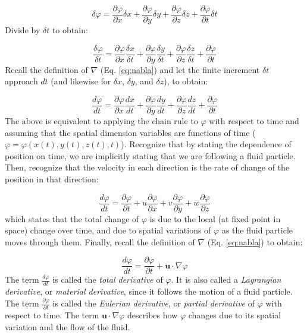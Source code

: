 \documentclass[12pt]{article}
\numberwithin{equation}{section}
\numberwithin{figure}{section}
\numberwithin{table}{section}
\begin{document}
\begin{equation}
  \delta\varphi = \frac{\partial \varphi}{\partial x} \delta x +
    \frac{\partial \varphi}{\partial y} \delta y +
    \frac{\partial \varphi}{\partial z} \delta z +
    \frac{\partial \varphi}{\partial t} \delta t
\end{equation}
Divide by $\delta t$ to obtain:

\begin{equation}
  \frac{\delta\varphi}{\delta t} = \frac{\partial \varphi}{\partial x} \frac{\delta x}{\delta t} +
    \frac{\partial \varphi}{\partial y} \frac{\delta y}{\delta t} +
    \frac{\partial \varphi}{\partial z} \frac{\delta z}{\delta t} +
    \frac{\partial \varphi}{\partial t}
\end{equation}
Recall the definition of $\nabla$ (Eq. \ref{eq:nabla}) and let the finite
increment $\delta t$ approach $dt$ (and likewise for $\delta x$, $\delta y$, and
$\delta z$), to obtain:

\begin{equation}
  \frac{d\varphi}{dt} = \frac{\partial \varphi}{\partial x} \frac{dx}{dt} +
    \frac{\partial \varphi}{\partial y} \frac{dy}{dt} +
    \frac{\partial \varphi}{\partial z} \frac{dz}{dt} +
    \frac{\partial \varphi}{\partial t}
\end{equation}
The above is equivalent to applying the chain rule to $\varphi$ with respect
to time and assuming that the spatial dimension variables are functions of time
($\varphi = \varphi(x(t), y(t), z(t), t)$).
Recognize that by stating the dependence of position on time, we are implicitly
stating that we are following a fluid particle.
Then, recognize that the velocity in each direction is the rate of change of
the position in that direction:

\begin{equation}
  \frac{d\varphi}{dt} =
    \frac{\partial \varphi}{\partial t} +
    u \frac{\partial \varphi}{\partial x} +
    v \frac{\partial \varphi}{\partial y} +
    w \frac{\partial \varphi}{\partial z}
\end{equation}
which states that the total change of $\varphi$ is due to the local (at fixed
point in space) change over time, and due to spatial variations of $\varphi$ as
the fluid particle moves through them.
Finally, recall the definition of $\nabla$ (Eq. \ref{eq:nabla}) to obtain:

\begin{equation}
  \label{eq:lagrangian_derivative}
  \frac{d\varphi}{dt} = \frac{\partial \varphi}{\partial t} + \mathbf{u} \cdot \nabla \varphi
\end{equation}
The term $\frac{d\varphi}{dt}$ is called the \textit{total derivative}
of $\varphi$. It is also called a \textit{Lagrangian derivative},
or \textit{material derivative}, since it follows
the motion of a fluid particle.
The term $\frac{\partial \varphi}{\partial t}$ is called the
\textit{Eulerian derivative},
or \textit{partial derivative}
of $\varphi$ with respect to time.
The term $\mathbf{u} \cdot \nabla \varphi$ describes how $\varphi$ changes due
to its spatial variation and the flow of the fluid.
\end{document}

